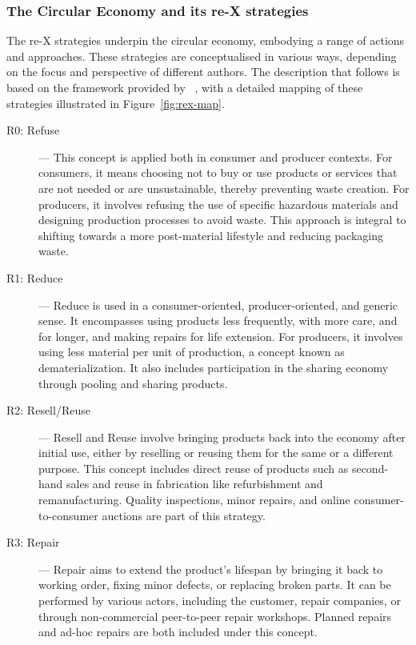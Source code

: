 \subsubsection{The Circular Economy and its re-X strategies}

The re-X strategies underpin the circular economy, embodying a range of actions and approaches. These strategies are conceptualised in various ways, depending on the focus and perspective of different authors. The description that follows is based on the framework provided by ~\cite{reike2018rex}, with a detailed mapping of these strategies illustrated in Figure~\ref{fig:rex-map}.

\begin{description}
    \item[R0: Refuse] — This concept is applied both in consumer and producer contexts. For consumers, it means choosing not to buy or use products or services that are not needed or are unsustainable, thereby preventing waste creation. For producers, it involves refusing the use of specific hazardous materials and designing production processes to avoid waste. This approach is integral to shifting towards a more post-material lifestyle and reducing packaging waste.

    \item[R1: Reduce] — Reduce is used in a consumer-oriented, producer-oriented, and generic sense. It encompasses using products less frequently, with more care, and for longer, and making repairs for life extension. For producers, it involves using less material per unit of production, a concept known as dematerialization. It also includes participation in the sharing economy through pooling and sharing products.

    \item[R2: Resell/Reuse] — Resell and Reuse involve bringing products back into the economy after initial use, either by reselling or reusing them for the same or a different purpose. This concept includes direct reuse of products such as second-hand sales and reuse in fabrication like refurbishment and remanufacturing. Quality inspections, minor repairs, and online consumer-to-consumer auctions are part of this strategy.

    \item[R3: Repair] — Repair aims to extend the product's lifespan by bringing it back to working order, fixing minor defects, or replacing broken parts. It can be performed by various actors, including the customer, repair companies, or through non-commercial peer-to-peer repair workshops. Planned repairs and ad-hoc repairs are both included under this concept.


\end{description}
